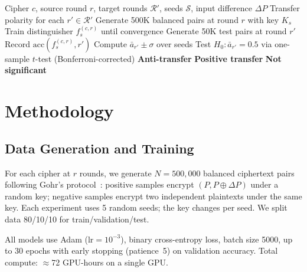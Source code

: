 \documentclass[runningheads]{llncs}
\begin{document}
\begin{algorithm}[t]
\caption{Cross-Round Transfer Evaluation}\label{alg:transfer}
\begin{algorithmic}[1]
\Require Cipher $c$, source round $r$, target rounds $\mathcal{R}'$, seeds $\mathcal{S}$, input difference $\Delta P$
\Ensure Transfer polarity for each $r' \in \mathcal{R}'$
  \State Generate 500K balanced pairs at round $r$ with key $K_s$
  \State Train distinguisher $f^{(c,r)}_s$ until convergence
    \State Generate 50K test pairs at round $r'$
    \State Record $\mathrm{acc}(f^{(c,r)}_s, r')$
  \EndFor
\EndFor
{}
  \State Compute $\bar{a}_{r'} \pm \sigma$ over seeds
  \State Test $H_0: \bar{a}_{r'} = 0.5$ via one-sample $t$-test (Bonferroni-corrected)
    \State \textbf{Anti-transfer}
    \State \textbf{Positive transfer}
  \Else
    \State \textbf{Not significant}
  \EndIf
\EndFor
\end{algorithmic}
\end{algorithm}


\section{Methodology}
\label{sec:method}

\subsection{Data Generation and Training}

For each cipher at $r$ rounds, we generate $N = 500{,}000$ balanced ciphertext pairs following Gohr's protocol~\cite{gohr2019}: positive samples encrypt $(P, P \oplus \Delta P)$ under a random key; negative samples encrypt two independent plaintexts under the same key.
Each experiment uses 5 random seeds; the key changes per seed.
We split data 80/10/10 for train/validation/test.

All models use Adam ($\text{lr} = 10^{-3}$), binary cross-entropy loss, batch size 5000, up to 30 epochs with early stopping (patience~5) on validation accuracy.
Total compute: $\approx$72 GPU-hours on a single GPU.
\end{document}
